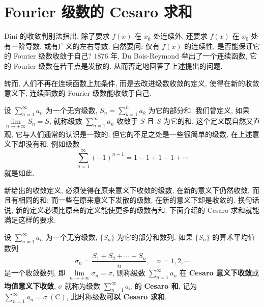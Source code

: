 \section{Fourier 级数的 Cesaro 求和}\label{sec:16.4}

Dini 的收敛判别法指出, 除了要求 $f(x)$ 在 $x_{0}$ 处连续外, 还要求 $f(x)$ 在 $x_{0}$ 处有一阶导数, 或有广义的左右导数. 自然要问: 仅有 $f(x)$ 的连续性, 是否能保证它的 Fourier 级数收敛于自己? $1876$ 年, Du Bois-Reymond 举出了一个连续函数, 它的 Fourier 级数在若干点是发散的. 从而否定地回答了上述提出的问题.

转而, 人们不再在连续函数上加条件, 而是去改进级数收敛的定义, 使得在新的收敛意义下, 连续函数的 Fourier 级数能收敛于自己.

设 $\displaystyle\sum_{n=1}^{\infty}a_{n}$ 为一个无穷级数, $S_{n}=\displaystyle\sum_{k=1}^{n}a_{k}$ 为它的部分和. 我们曾定义, 如果 $\lim\limits_{n\to+\infty}S_{n}=S$, 就称级数 $\displaystyle\sum_{n=1}^{\infty}a_{n}$ 收敛于 $S$ 且 $S$ 为它的和. 这个定义既自然又直观, 它与人们通常的认识是一致的. 但它的不足之处是一些很简单的级数, 在上述意义下却没有和. 例如级数
\[
  \sum_{n=1}^{\infty}(-1)^{n-1}=1-1+1-1+\cdots
\]
就是如此.

新给出的收敛定义, 必须使得在原来意义下收敛的级数, 在新的意义下仍然收敛, 而且有相同的和; 而一些在原来意义下发散的级数, 在新的意义下却是收敛的. 换句话说, 新的定义必须比原来的定义能使更多的级数有和. 下面介绍的 Cesaro 求和就能满足这样的要求.

\begin{definition}\label{def:16.4.1}
设 $\displaystyle\sum_{n=1}^{\infty}a_{n}$ 为一个无穷级数, $\{S_{n}\}$ 为它的部分和数列. 如果 $\{S_{n}\}$ 的算术平均值数列
\[
  \sigma_{n}=\frac{S_{1}+S_{2}+\cdots+S_{n}}{n},\quad n=1,2,\cdots
\]
是一个收敛数列, 即 $\lim\limits_{n\to+\infty}\sigma_{n}=\sigma$, 则称级数 $\displaystyle\sum_{n=1}^{\infty}a_{n}$ 在 \textbf{Cesaro 意义下收敛}或\textbf{均值意义下收敛}, $\sigma$ 就称为级数 $\displaystyle\sum_{n=1}^{\infty}a_{n}$ 的 \textbf{Cesaro 和}, 记为 $\displaystyle\sum_{n=1}^{\infty}a_{n}=\sigma\ (\mathrm{C})$, 此时称级数\textbf{可以 Cesaro 求和}.
\end{definition}

